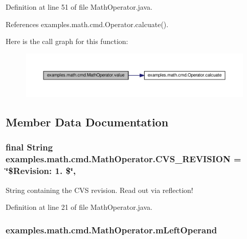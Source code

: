 Definition at line 51 of file Math\-Operator.\-java.



References examples.\-math.\-cmd.\-Operator.\-calcuate().



Here is the call graph for this function\-:
\nopagebreak
\begin{figure}[H]
\begin{center}
\leavevmode
\includegraphics[width=350pt]{classexamples_1_1math_1_1cmd_1_1_math_operator_a94d1b7d6b6d29c8cad4518a44011a493_cgraph}
\end{center}
\end{figure}




\subsection{Member Data Documentation}
\hypertarget{classexamples_1_1math_1_1cmd_1_1_math_operator_a55996e98ba30817cfbc7bd446c9a3461}{
\subsubsection[{C\-V\-S\-\_\-\-R\-E\-V\-I\-S\-I\-O\-N}]{\setlength{\rightskip}{0pt plus 5cm}final String examples.\-math.\-cmd.\-Math\-Operator.\-C\-V\-S\-\_\-\-R\-E\-V\-I\-S\-I\-O\-N = \char`\"{}\$Revision\-: 1. \$\char`\"{}\hspace{0.3cm}{\ttfamily [static]}, {\ttfamily [private]}}}\label{classexamples_1_1math_1_1cmd_1_1_math_operator_a55996e98ba30817cfbc7bd446c9a3461}
String containing the C\-V\-S revision. Read out via reflection! 

Definition at line 21 of file Math\-Operator.\-java.

\hypertarget{classexamples_1_1math_1_1cmd_1_1_math_operator_ad6d25295790c86cf6d8bb5fb92efff68}{
\subsubsection[{m\-Left\-Operand}]{ examples.\-math.\-cmd.\-Math\-Operator.\-m\-Left\-Operand\hspace{0.3cm}{\ttfamily [private]}}}\label{classexamples_1_1math_1_1cmd_1_1_math_operator_ad6d25295790c86cf6d8bb5fb92efff68}


